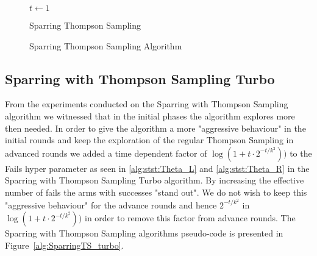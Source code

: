 \documentclass{llncs}
\begin{document}
	\begin{figure}[h]
	\IncMargin{1em}
		\begin{algorithm}[H]
		
		\BlankLine
		$t\leftarrow 1$\\
			\caption{Sparring Thompson Sampling}
		\end{algorithm}
		\caption{Sparring Thompson Sampling Algorithm}\label{algo_SparringTS}
	\end{figure}
	
	\subsection{Sparring with Thompson Sampling Turbo}
	From the experiments conducted on the Sparring with Thompson Sampling algorithm we witnessed that in the initial phases the algorithm explores more then needed. 
	In order to give the algorithm a more "aggressive behaviour" in the initial rounds and keep the exploration of the regular Thompson Sampling in advanced rounds we added a time dependent factor of $\log(1+t\cdot 2^{-t/k^2}))$ to the Fails hyper parameter as seen in \eqref{alg:stst:Theta_L} and \eqref{alg:stst:Theta_R} in the Sparring with Thompson Sampling Turbo algorithm.
	By increasing the effective number of fails the arms with successes "stand out".  We do not wish to keep this "aggressive behaviour" for the advance rounds and hence $2^{-t/k^2}$ in $\log(1+t\cdot 2^{-t/k^2}))$ in order to remove this factor from advance rounds.
	The Sparring with Thompson Sampling algorithms pseudo-code is presented in Figure~\ref{alg:SparringTS_turbo}.
	 
\end{document}
